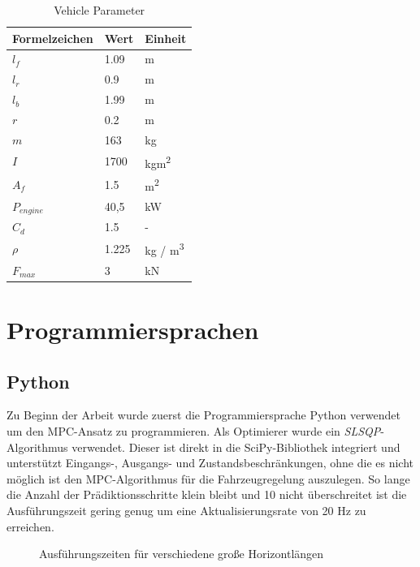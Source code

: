 \documentclass{like}
\begin{document}
\begin{table}[]
	\centering
	\begin{tabular}{l|l|l}
		\hline
		Formelzeichen	& Wert & Einheit \\ \hline
		\(l_f\)	&	1.09 & m\\
		\(l_r\)	&	0.9 & m\\
		\(l_b\)	&	1.99 & m \\
		\(r\)	&	0.2 & m \\
		\(m\)	&  	163 & kg\\
		\(I\)	&  	1700 & kgm\textsuperscript{2}\\
		\(A_f\)	&  	1.5 & m\textsuperscript{2}\\
		\(P_{engine}\) &  40,5 & kW\\
		\(C_d\)	&  	1.5 & - \\
		\(\rho\)	&  	1.225 & kg / m\textsuperscript{3}\\
		\(F_{max}\)	&  	3 & kN \\ 
	\end{tabular}
	\caption{Vehicle Parameter}
	\label{vehicleParam}
\end{table}





\section{Programmiersprachen}
\subsection{Python}

Zu Beginn der Arbeit wurde zuerst die Programmiersprache Python verwendet um den \ac{MPC}-Ansatz zu programmieren. Als Optimierer wurde ein \emph{\ac{SLSQP}}-Algorithmus verwendet. Dieser ist direkt in die SciPy-Bibliothek integriert und unterstützt Eingangs-, Ausgangs- und Zustandsbeschränkungen, ohne die es nicht möglich ist den \ac{MPC}-Algorithmus für die Fahrzeugregelung auszulegen. So lange die Anzahl der Prädiktionsschritte klein bleibt und 10 nicht überschreitet ist die Ausführungszeit gering genug um eine Aktualisierungsrate von 20 Hz zu erreichen. 

\begin{figure}[ht!]
	\centering
	 
	\caption{Ausführungszeiten für verschiedene  große Horizontlängen}
	\label{fig:pythonBench}
\end{figure}
\end{document}
